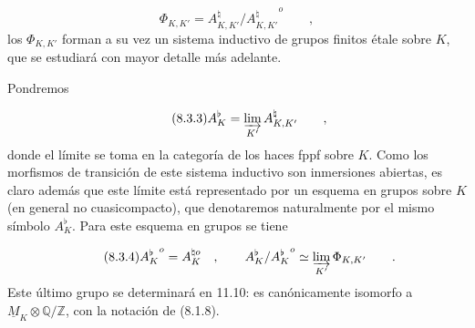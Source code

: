 \begin{equation}\tag{8.3.2}
\Phi_{K,K'}=A^{\natural}_{K,K'}
 /{A^{\natural}_{K,K'}}^{o} \qquad ,
\end{equation}
los $\Phi_{K,K'}$ forman a su vez un sistema inductivo de grupos finitos
étale sobre $K$, que se estudiará con mayor detalle más adelante.

Pondremos

\begin{equation}\tag{8.3.3}
A^{\flat}_{K}=\varinjlim_{K'} A^{\natural}_{K,K'} \qquad ,
\end{equation}
donde el límite se toma en la categoría de los haces fppf sobre $K$.
Como los morfismos de transición de este sistema inductivo son
inmersiones abiertas, es claro además que este límite está representado
por un esquema en grupos sobre $K$ (en general no cuasicompacto), que
denotaremos naturalmente por el mismo símbolo $A^{\flat}_{K}$. Para
este esquema en grupos se tiene

\begin{equation}\tag{8.3.4}
{A_{K}^{\flat}}^{o}=A_{K}^{\natural o} \quad , \qquad
A^{\flat}_{K}/{A_{K}^{\flat}}^{o}
 \simeq \varinjlim_{K'}\Phi_{K,K'} \qquad .
\end{equation}
Este último grupo se determinará en 11.10: es canónicamente isomorfo a
$\underline{M}_{K}\otimes\mathbb{Q}/\mathbb{Z}$, con la notación de
(8.1.8).
